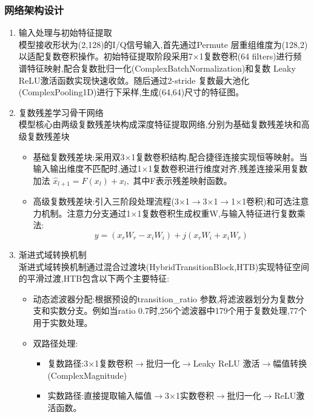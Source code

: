 \documentclass{article}
\begin{document}
\begin{CJK}{UTF8}{gbsn}
\subsubsection{网络架构设计}
\begin{enumerate}
    \item 输入处理与初始特征提取 \\
    模型接收形状为(2,128)的I/Q信号输入,首先通过Permute 层重组维度为(128,2)以适配复数卷积操作。初始特征提取阶段采用7$\times$1复数卷积(64 filters)进行频谱特征映射,配合复数批归一化(ComplexBatchNormalization)和复数 Leaky ReLU激活函数实现快速收敛。随后通过2-stride 复数最大池化(ComplexPooling1D)进行下采样,生成(64,64)尺寸的特征图。
    \item 复数残差学习骨干网络 \\
    模型核心由两级复数残差块构成深度特征提取网络,分别为基础复数残差块和高级复数残差块
    \begin{itemize}
        \item 基础复数残差块:采用双3$\times$1复数卷积结构,配合捷径连接实现恒等映射。当输入输出维度不匹配时,通过1$\times$1复数卷积进行维度对齐,残差连接采用复数加法 $\hat{x}_{l+1}=F(x_{l})+x_{l},$ 其中F表示残差映射函数。
        \item 高级复数残差块:引入三阶段处理流程(3$\times$1$\rightarrow$3$\times$1$\rightarrow$1$\times$1卷积)和可选注意力机制。注意力分支通过1$\times$1复数卷积生成权重W,与输入特征进行复数乘法:
        \begin{equation}
            y=(x_{r}W_{r}-x_{i}W_{i}) + j(x_{r}W_{i} + x_{i}W_{r})
            \label{eq:complex_attention}
        \end{equation}
    \end{itemize}
    \item 渐进式域转换机制 \\
    渐进式域转换机制通过混合过渡块(HybridTransitionBlock,HTB)实现特征空间的平滑过渡,HTB包含以下两个主要特征:
    \begin{itemize}
        \item 动态滤波器分配:根据预设的transition\_ratio 参数,将滤波器划分为复数分支和实数分支。例如当ratio 0.7时,256个滤波器中179个用于复数处理,77个用于实数处理。
        \item 双路径处理:
        \begin{itemize}
            \item 复数路径:3$\times$1复数卷积$\rightarrow$批归一化$\rightarrow$Leaky ReLU 激活$\rightarrow$幅值转换(ComplexMagnitude)
            \item 实数路径:直接提取输入幅值$\rightarrow$3$\times$1实数卷积$\rightarrow$批归一化$\rightarrow$ReLU激活函数。

\end{itemize}
\end{itemize}
\end{enumerate}
\end{CJK}
\end{document}

